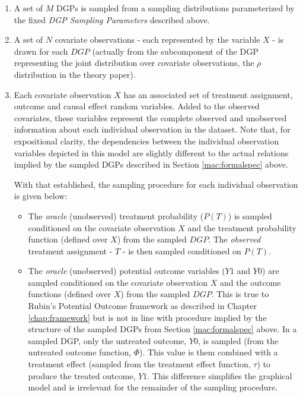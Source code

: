 \documentclass[../main.tex]{subfiles}
\begin{document}
\begin{enumerate}

\item A set of $M$ DGPs is sampled from a sampling distributions parameterized by the fixed \textit{DGP Sampling Parameters} described above.

\item A set of $N$ covariate observations - each represented by the variable $X$ - is drawn for each $DGP$ (actually from the subcomponent of the DGP representing the joint distribution over covariate observations, the $\rho$ distribution in the theory paper).

\item Each covariate observation $X$ has an associated set of treatment assignment, outcome and causal effect random variables. Added to the observed covariates, these variables represent the complete observed and unobserved information about each individual observation in the dataset. Note that, for expositional clarity, the dependencies between the individual observation variables depicted in this model are slightly different to the actual relations implied by the sampled DGPs described in Section \ref{mac:formalspec} above.

\vspace{\baselineskip}

With that established, the sampling procedure for each individual observation is given below:

\begin{itemize}
    \item The \textit{oracle} (unobserved) treatment probability ($P(T)$) is sampled conditioned on the covariate observation $X$ and the treatment probability function (defined over $X$) from the sampled $DGP$. The \textit{observed} treatment assignment - $T$ - is then sampled conditioned on $P(T)$.
    
    \item The \textit{oracle} (unobserved) potential outcome variables ($Y1$ and $Y0$) are sampled conditioned on the covariate observation $X$ and the outcome functions (defined over $X$) from the sampled $DGP$. This is true to Rubin's Potential Outcome framework as described in Chapter \ref{chap:framework} but is not in line with procedure implied by the structure of the sampled DGPs from Section \ref{mac:formalspec} above. In a sampled DGP, only the untreated outcome, $Y0$, is sampled (from the untreated outcome function, $\Phi$). This value is them combined with a treatment effect (sampled from the treatment effect function, $\tau$) to produce the treated outcome, $Y1$. This difference simplifies the graphical model and is irrelevant for the remainder of the sampling procedure.
    

\end{itemize}
\end{enumerate}
\end{document}
